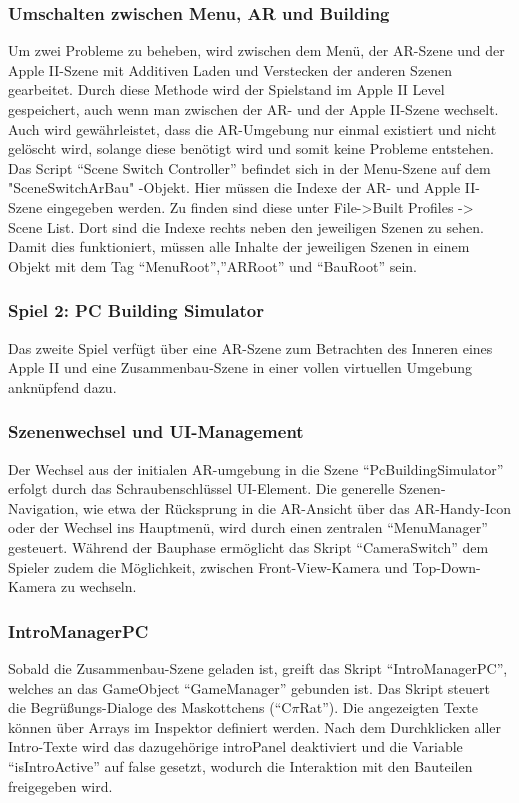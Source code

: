 \subsubsection*{Umschalten zwischen Menu, AR und Building}
Um zwei Probleme zu beheben, wird zwischen dem Menü, der AR-Szene und der Apple II-Szene mit Additiven Laden und Verstecken der anderen Szenen gearbeitet. Durch diese Methode wird der Spielstand im Apple II Level gespeichert, auch wenn man zwischen der AR- und der Apple II-Szene wechselt. Auch wird gewährleistet, dass die AR-Umgebung nur einmal existiert und nicht gelöscht wird, solange diese benötigt wird und somit keine Probleme entstehen. Das Script “Scene Switch Controller” befindet sich in der Menu-Szene auf dem "SceneSwitchArBau" -Objekt. Hier müssen die Indexe der AR- und Apple II-Szene eingegeben werden. Zu finden sind diese unter File->Built Profiles -> Scene List. Dort sind die Indexe rechts neben den jeweiligen Szenen zu sehen. Damit dies funktioniert, müssen alle Inhalte der jeweiligen Szenen in einem Objekt mit dem Tag “MenuRoot”,”ARRoot” und “BauRoot” sein.

\subsubsection{Spiel 2: PC Building Simulator}
Das zweite Spiel verfügt über eine AR-Szene zum Betrachten des Inneren eines Apple II und eine Zusammenbau-Szene in einer vollen virtuellen Umgebung anknüpfend dazu.

\subsubsection*{Szenenwechsel und UI-Management}
Der Wechsel aus der initialen AR-umgebung in die Szene “PcBuildingSimulator” erfolgt durch das Schraubenschlüssel UI-Element. Die generelle Szenen-Navigation, wie etwa der Rücksprung in die AR-Ansicht über das AR-Handy-Icon oder der Wechsel ins Hauptmenü, wird durch einen zentralen “MenuManager” gesteuert. Während der Bauphase ermöglicht das Skript “CameraSwitch” dem Spieler zudem die Möglichkeit, zwischen Front-View-Kamera und Top-Down-Kamera zu wechseln.

\subsubsection*{IntroManagerPC}
Sobald die Zusammenbau-Szene geladen ist, greift das Skript “IntroManagerPC”, welches an das GameObject “GameManager” gebunden ist. Das Skript steuert die Begrüßungs-Dialoge des Maskottchens (“C$\pi$Rat”). Die angezeigten Texte können über Arrays im Inspektor definiert werden. Nach dem Durchklicken aller Intro-Texte wird das dazugehörige introPanel deaktiviert und die Variable “isIntroActive” auf false gesetzt, wodurch die Interaktion mit den Bauteilen freigegeben wird.

